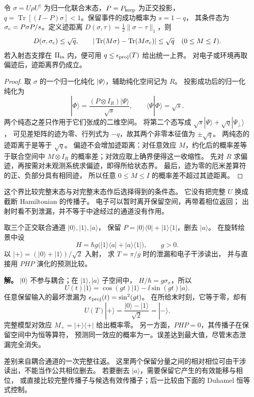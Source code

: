 \begin{proposition}[末态后选择的成功概率与状态误差]
令 $\sigma=U\rho U^\dagger$ 为归一化联合末态，$P=P_{\rm keep}$ 为正交投影，
$q=\operatorname{Tr}[(I-P)\sigma]<1$。保留事件的成功概率为 $s=1-q$，
其条件态为 $\sigma_{\rm c}=P\sigma P/s$。定义迹距离
$D(\sigma,\tau)=\tfrac12\|\sigma-\tau\|_1$，则
\[
D(\sigma,\sigma_{\rm c})\le\sqrt q,\qquad
|\operatorname{Tr}(M\sigma)-\operatorname{Tr}(M\sigma_{\rm c})|
\le\sqrt q\quad(0\le M\le I).
\]
若入射态支撑在 $\Pi_{\rm in}$ 内，便可用
$q\le\epsilon_{\rm proj}(T)$ 给出统一上界。
对电子或环境再取偏迹后，迹距离界仍成立。
\end{proposition}
\begin{proof}
取 $\sigma$ 的一个归一化纯化 $|\Psi\rangle$，辅助纯化空间记为 $R$。
投影成功后的归一化纯化为
\[
|\Phi\rangle=\frac{(P\otimes I_R)|\Psi\rangle}{\sqrt s},\qquad
\langle\Psi|\Phi\rangle=\sqrt s.
\]
两个纯态之差只作用于它们张成的二维空间。
将第二个态写成 $\sqrt s|\Psi\rangle+\sqrt q|\Psi_\perp\rangle$，
可见差矩阵的迹为零、行列式为 $-q$，故其两个非零本征值为 $\pm\sqrt q$。
两纯态的迹距离于是等于 $\sqrt q$。
偏迹不会增加迹距离：对任意效应 $M$，约化后的概率差等于联合空间中
$M\otimes I_R$ 的概率差；对效应取上确界便得这一收缩性。
先对 $R$ 求偏迹，再按需对未观测系统求偏迹，即得所给状态界。
最后，迹为零的厄米差算符的正、负部分具有相同迹，
所以任意 $0\le M\le I$ 的概率差不超过其迹距离。
\end{proof}

这个界比较完整末态与对完整末态作后选择得到的条件态。
它没有把完整 $U$ 换成截断 Hamiltonian 的传播子。
电子可以暂时离开保留空间，再带着相位返回；
出射时看不到泄漏，并不等于中途经过的通道没有作用。

\begin{exbox}[零末态泄漏仍会改变干涉相位]
取三个正交联合通道 $|0\rangle,|1\rangle,|a\rangle$，
保留 $P=|0\rangle\langle0|+|1\rangle\langle1|$，删去 $|a\rangle$。
在旋转绘景中设
\[
H=\hbar g\bigl(|1\rangle\langle a|+|a\rangle\langle1|\bigr),\qquad g>0.
\]
以 $|+\rangle=(|0\rangle+|1\rangle)/\sqrt2$ 入射，
求 $T=\pi/g$ 时的泄漏和电子干涉读出，
并与直接用 $PHP$ 演化的预测比较。

\textbf{解。} $|0\rangle$ 不参与耦合；在 $|1\rangle,|a\rangle$ 子空间中，
$H/\hbar=g\sigma_x$，所以
\[
U(t)|1\rangle=\cos(gt)|1\rangle-\ii\sin(gt)|a\rangle.
\]
任意保留输入的最坏泄漏为 $\epsilon_{\rm proj}(t)=\sin^2(gt)$。
在所给末时刻，它等于零，却有
\[
U(T)|+\rangle=\frac{|0\rangle-|1\rangle}{\sqrt2}=| -\rangle.
\]
完整模型对效应 $M_+=|+\rangle\langle+|$ 给出概率零。
另一方面，$PHP=0$，其传播子在保留空间中为恒等算符，
预测同一效应的概率为一。误差达到最大值，尽管末态泄漏完全消失。

差别来自耦合通道的一次完整往返。
这里两个保留分量之间的相对相位可由干涉读出，不能当作公共相位删去。
若要删去 $|a\rangle$，需要保留它产生的有效能移与相位，
或直接比较完整传播子与候选有效传播子；后一比较由下面的 Duhamel 恒等式控制。
\end{exbox}
